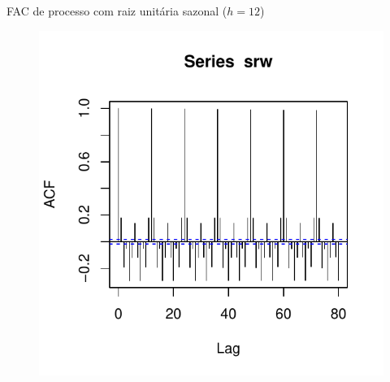 \documentclass[11pt]{beamer}
\begin{document}
\begin{frame}{FAC de processo com raiz unitária sazonal ($h=12$)}
	
	\begin{figure}
		\includegraphics[scale=0.8]{graficos/fac_srw.pdf} 	
	\end{figure}
\end{frame}
\end{document}

